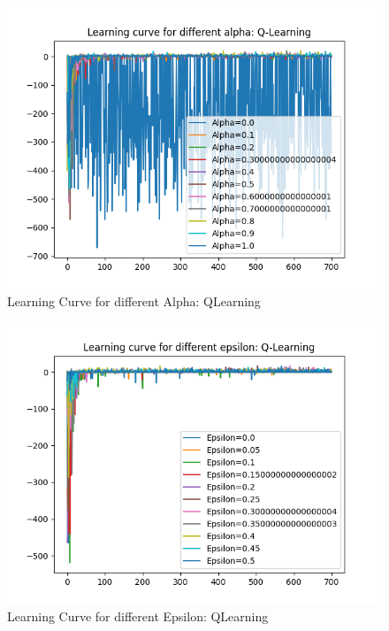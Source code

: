 \documentclass[conf]{new-aiaa}
\begin{document}
\begin{figure}[H]
\centering
\includegraphics[width=30pc]{figs/pen/alpha_sweep_qlearning.png}
\caption{Learning Curve for different Alpha: QLearning}
\label{fig_env1}
\end{figure}


\begin{figure}[H]
\centering
\includegraphics[width=30pc]{figs/pen/epsilon_sweep_qlearning.png}
\caption{Learning Curve for different Epsilon: QLearning}
\label{fig_env1}
\end{figure}
\end{document}
